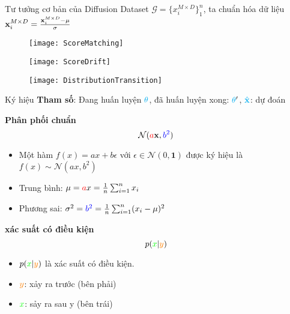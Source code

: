 \begin{frame}{Tư tưởng cơ bản của Diffusion}
	Dataset $\mathcal{G} = \{ x_{i}^{M \times D} \}_{1}^{n}$, ta chuẩn hóa dữ liệu $\mathbf{x}_{i}^{M \times D} = \frac{\mathbf{x}_{i}^{M \times D} - \mu}{\sigma}$
\begin{figure}
	\texttt{[image: ScoreMatching]}
\end{figure}
\vspace{-10pt}
\begin{figure}
	\texttt{[image: ScoreDrift]}
\end{figure}

\vspace{-10pt}

\begin{figure}
	\texttt{[image: DistributionTransition]}
\end{figure}

\end{frame}

\begin{frame}{Ký hiệu}
	\textbf{Tham số}: Đang huấn luyện {\Large$\textcolor{cyan}{\theta}$}, đã huấn luyện xong: {\Large$\textcolor{cyan}{\theta}'$}, {\Large$\textcolor{cyan}{\hat{\mathbf{x}}}$}: dự đoán
	\vspace{-5pt}
	
	\textbf{Phân phối chuẩn}
	\vspace{-5pt}
	{\Large $$\mathcal{N}(\textcolor{red}{a} \mathbf{x}, \textcolor{blue}{b^2})$$}
	\vspace{-15pt}
	\begin{itemize}
		\item Một hàm $f(x) = a x + b\epsilon$ với $\epsilon \in \mathcal{N}(0, \mathbf{1})$ được ký hiệu là $f(x) \sim \mathcal{N}(a x, b^2) $
		
		\item Trung bình: $\mu = \textcolor{red}{a}x=\frac{1}{n} \sum_{i=1}^{n} x_i$
		
		\item Phương sai: $\sigma^2 = \textcolor{blue} {b^2} = \frac{1}{n} \sum_{i=1}^{n} (x_i - \mu)^2$
		
	\end{itemize}
	\textbf{xác suất có điều kiện}
	\vspace{-5pt}
	{\Large $$p(\textcolor{green}{x}| \textcolor{orange}{y})$$}
	\vspace{-15pt}
	
	\begin{itemize}
		\item $p(\textcolor{green}{x}| \textcolor{orange}{y})$ là xác suất có điều kiện.
		\item $\textcolor{orange}{y}$: xảy ra trước (bên phải)
		\item $\textcolor{green}{x}$: sảy ra sau y (bên trái)
	\end{itemize}

\end{frame}

